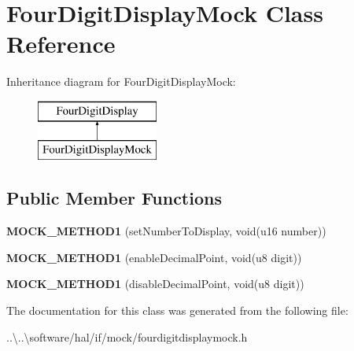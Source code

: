 \hypertarget{class_four_digit_display_mock}{}\section{Four\+Digit\+Display\+Mock Class Reference}
\label{class_four_digit_display_mock}
Inheritance diagram for Four\+Digit\+Display\+Mock\+:\begin{figure}[H]
\begin{center}
\leavevmode
\includegraphics[height=2.000000cm]{class_four_digit_display_mock}
\end{center}
\end{figure}
\subsection*{Public Member Functions}
\begin{DoxyCompactItemize}
\item 
\mbox{\label{class_four_digit_display_mock_ab597d895ae1f604eb0dd0e8d7920c743}} 
{\bfseries M\+O\+C\+K\+\_\+\+M\+E\+T\+H\+O\+D1} (set\+Number\+To\+Display, void(u16 number))
\item 
\mbox{\label{class_four_digit_display_mock_a11fcce7703bbb5d7b13eb4dcbdcb15fe}} 
{\bfseries M\+O\+C\+K\+\_\+\+M\+E\+T\+H\+O\+D1} (enable\+Decimal\+Point, void(u8 digit))
\item 
\mbox{\label{class_four_digit_display_mock_aaa591f57311085358e7a17e22b057b90}} 
{\bfseries M\+O\+C\+K\+\_\+\+M\+E\+T\+H\+O\+D1} (disable\+Decimal\+Point, void(u8 digit))
\end{DoxyCompactItemize}


The documentation for this class was generated from the following file\+:\begin{DoxyCompactItemize}
\item 
..\textbackslash{}..\textbackslash{}software/hal/if/mock/fourdigitdisplaymock.\+h\end{DoxyCompactItemize}
